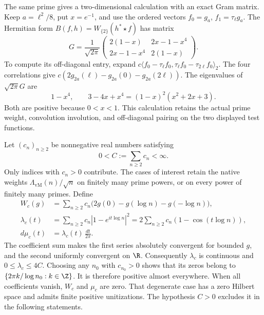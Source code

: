 The same prime gives a two-dimensional calculation with an exact Gram
matrix.  Keep $a=\ell^2/8$, put $x=e^{-1}$, and use the ordered vectors
$f_0=g_a$, $f_1=\tau_\ell g_a$.
The Hermitian form $B(f,h)=W_{\{2\}}(h^*\star f)$ has matrix
\begin{equation}
 G=\frac1{\sqrt{2\pi}}
 \begin{pmatrix}
 2(1-x)&2x-1-x^4\\
 2x-1-x^4&2(1-x)
 \end{pmatrix}.
 \label{eq:wp-two-vector-gram}
\end{equation}
To compute its off-diagonal entry, expand
$c\langle f_0-\tau_\ell f_0,
\tau_\ell f_0-\tau_{2\ell}f_0\rangle_2$.
The four correlations give
$c(2g_{2a}(\ell)-g_{2a}(0)-g_{2a}(2\ell))$.
The eigenvalues of $\sqrt{2\pi}G$ are
\[
 1-x^4,\qquad 3-4x+x^4=(1-x)^2(x^2+2x+3).
\]
Both are positive because $0<x<1$.
This calculation retains the actual prime weight, convolution involution,
and off-diagonal pairing on the two displayed test functions.

Let $(c_n)_{n\geq2}$ be nonnegative real numbers satisfying
\[
 0<C:=\sum_{n\geq2}c_n<\infty.
\]
Only indices with $c_n>0$ contribute.
The cases of interest retain the native weights
$\Lambda_{\mathrm{vM}}(n)/\sqrt n$ on finitely many prime powers,
or on every power of finitely many primes.
Define
\begin{equation}
 \begin{aligned}
 W_c(g)&=\sum_{n\geq2}c_n
       \bigl(2g(0)-g(\log n)-g(-\log n)\bigr),\\
 \lambda_c(t)&=\sum_{n\geq2}c_n|1-e^{it\log n}|^2
       =2\sum_{n\geq2}c_n(1-\cos(t\log n)),\\
 d\mu_c(t)&=\lambda_c(t)\,\frac{dt}{2\pi}.
 \end{aligned}
 \label{eq:wp-positive-density}
\end{equation}
The coefficient sum makes the first series absolutely convergent for
bounded $g$, and the second uniformly convergent on $\R$.
Consequently $\lambda_c$ is continuous and $0\leq\lambda_c\leq4C$.
Choosing any $n_0$ with $c_{n_0}>0$ shows that its zeros belong to
$\{2\pi k/\log n_0:k\in\Z\}$.
It is therefore positive almost everywhere.
When all coefficients vanish, $W_c$ and $\mu_c$ are zero.
That degenerate case has a zero Hilbert space and admits finite positive
unitizations.  The hypothesis $C>0$ excludes it in the following statements.

